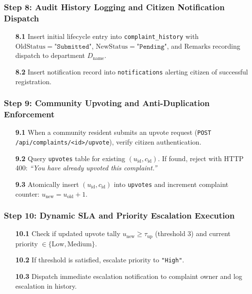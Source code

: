 \documentclass[12pt,a4paper]{report}
\begin{document}
\subsubsection*{Step 8: Audit History Logging and Citizen Notification Dispatch}
\begin{enumerate}
  \item[\textbf{8.1}] Insert initial lifecycle entry into \texttt{complaint\_history} with $\mathrm{OldStatus} = \texttt{"Submitted"}$, $\mathrm{NewStatus} = \texttt{"Pending"}$, and $\mathrm{Remarks}$ recording dispatch to department $D_{\text{name}}$.
  \item[\textbf{8.2}] Insert notification record into \texttt{notifications} alerting citizen of successful registration.
\end{enumerate}

\subsubsection*{Step 9: Community Upvoting and Anti-Duplication Enforcement}
\begin{enumerate}
  \item[\textbf{9.1}] When a community resident submits an upvote request (\texttt{POST /api/complaints/<id>/upvote}), verify citizen authentication.
  \item[\textbf{9.2}] Query \texttt{upvotes} table for existing $(u_{\text{id}}, c_{\text{id}})$. If found, reject with HTTP 400: \textit{``You have already upvoted this complaint.''}
  \item[\textbf{9.3}] Atomically insert $(u_{\text{id}}, c_{\text{id}})$ into \texttt{upvotes} and increment complaint counter: $u_{\text{new}} = u_{\text{old}} + 1$.
\end{enumerate}

\subsubsection*{Step 10: Dynamic SLA and Priority Escalation Execution}
\begin{enumerate}
  \item[\textbf{10.1}] Check if updated upvote tally $u_{\text{new}} \ge \tau_{\text{up}}$ (threshold 3) and current priority $\in \{\text{Low}, \text{Medium}\}$.
  \item[\textbf{10.2}] If threshold is satisfied, escalate priority to \texttt{"High"}.
  \item[\textbf{10.3}] Dispatch immediate escalation notification to complaint owner and log escalation in history.
\end{enumerate}
\end{document}
